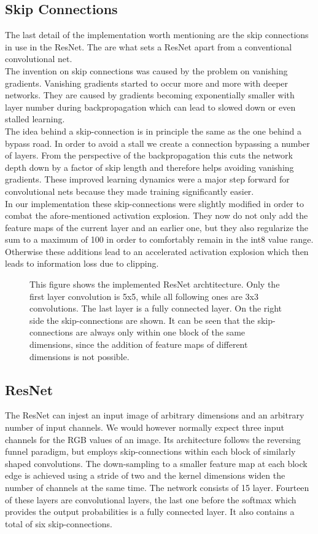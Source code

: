 \documentclass[]{IEEEtran}
\begin{document}
\subsection{Skip Connections}
The last detail of the implementation worth mentioning are the skip connections in use in the ResNet. The are what sets a ResNet apart from a conventional convolutional net. \\
The invention on skip connections was caused by the problem on vanishing gradients. Vanishing gradients started to occur more and more with deeper networks. They are caused by gradients becoming exponentially smaller with layer number during backpropagation which can lead to slowed down or even stalled learning. \\
The idea behind a skip-connection is in principle the same as the one behind a bypass road. In order to avoid a stall we create a connection bypassing a number of layers. From the perspective of the backpropagation this cuts the network depth down by a factor of skip length and therefore helps avoiding vanishing gradients. These improved learning dynamics were a major step forward for convolutional nets because they made training significantly easier.\\
In our implementation these skip-connections were slightly modified in order to combat the afore-mentioned activation explosion. They now do not only add the feature maps of the current layer and an earlier one, but they also regularize the sum to a maximum of 100 in order to comfortably remain in the int8 value range. Otherwise these additions lead to an accelerated activation explosion which then leads to information loss due to clipping. 

\begin{figure}[h]
  \centering
   
  \caption{This figure shows the implemented ResNet archtitecture. Only the first layer convolution is 5x5, while all following ones are 3x3 convolutions. The last layer is a fully connected layer. On the right side the skip-connections are shown. It can be seen that the skip-connections are always only within one block of the same dimensions, since the addition of feature maps of different dimensions is not possible.}
\end{figure}

\subsection{ResNet}
The ResNet can injest an input image of arbitrary dimensions and an arbitrary number of input channels. We would however normally expect three input channels for the RGB values of an image. Its architecture follows the reversing funnel paradigm, but employs skip-connections within each block of similarly shaped convolutions. The down-sampling to a smaller feature map at each block edge is achieved using a stride of two and the kernel dimensions widen the number of channels at the same time.  The network consists of 15 layer. Fourteen of these layers are convolutional layers, the last one before the softmax which provides the output probabilities is a fully connected layer. It also contains a total of six skip-connections. 
\end{document}

